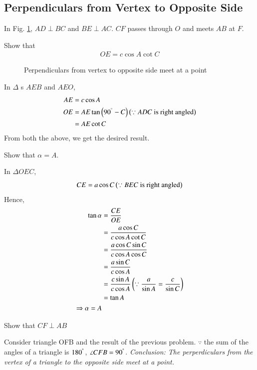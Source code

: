\subsection{Perpendiculars from Vertex to Opposite Side}
	In Fig. \ref{ch3_perp_triang}, $AD \perp BC$ and $BE \perp AC$. $CF$ passes through $O$ and meets
	$AB$ at $F$.  	
\begin{problem}
	Show that 
	\begin{align}
	OE = c \cos A \cot C
	\end{align}
\end{problem}
	\begin{figure}[!ht]
		\begin{center}
			
			\resizebox{\columnwidth}{!}{}
		\end{center}
		\caption{Perpendiculars from vertex to opposite side meet at a point}
		\label{ch3_perp_triang}	
	\end{figure}
%
\proof In $\Delta$ s $AEB$ and $AEO$,
%
\begin{align}
AE &= c \cos A \\
OE &= AE \tan \left(90^{\degree} - C\right) \left(\because ADC \text{ is right angled}\right) \\
&= AE \cot C
\end{align}
%
From both the above, we get the desired result.
%
\begin{problem}
	Show that $\alpha = A$.
\end{problem}
\proof In $\Delta OEC$,
%
\begin{equation}
CE = a \cos C \left(\because BEC \text{ is right angled}\right)
\end{equation}
%
Hence,
%
\begin{equation}
\begin{split}
\tan \alpha &= \frac{CE}{OE} \\
&=  \frac{a \cos C}{c \cos A \cot C} \\
&=  \frac{a \cos C \sin C}{c \cos A \cos C} \\
&= \frac{a \sin C}{c \cos A } \\
&= \frac{c \sin A}{c \cos A } \left(\because \frac{a}{\sin A} = \frac{c}{\sin C}\right)\\
&= \tan A\\
\Rightarrow \alpha = A
\end{split}
\end{equation}
%
\begin{problem}
	Show that $CF \perp AB$
\end{problem}
\proof Consider triangle OFB and the result of the previous problem.  $\because$ the sum of the angles of a triangle is $180^{\degree}$, $\angle CFB = 90^{\degree}$.
{\em Conclusion: The perperdiculars from the vertex of a triangle to the opposite side meet at a point.}